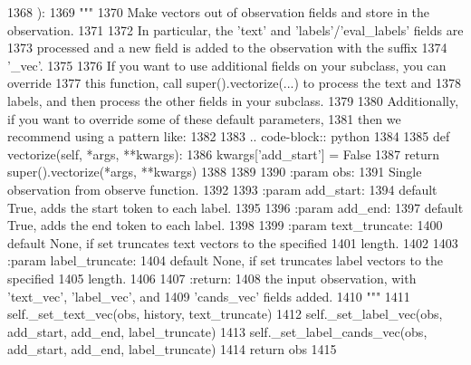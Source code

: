 \begin{DoxyCode}
1368     ):
1369         \textcolor{stringliteral}{"""}
1370 \textcolor{stringliteral}{        Make vectors out of observation fields and store in the observation.}
1371 \textcolor{stringliteral}{}
1372 \textcolor{stringliteral}{        In particular, the 'text' and 'labels'/'eval\_labels' fields are}
1373 \textcolor{stringliteral}{        processed and a new field is added to the observation with the suffix}
1374 \textcolor{stringliteral}{        '\_vec'.}
1375 \textcolor{stringliteral}{}
1376 \textcolor{stringliteral}{        If you want to use additional fields on your subclass, you can override}
1377 \textcolor{stringliteral}{        this function, call super().vectorize(...) to process the text and}
1378 \textcolor{stringliteral}{        labels, and then process the other fields in your subclass.}
1379 \textcolor{stringliteral}{}
1380 \textcolor{stringliteral}{        Additionally, if you want to override some of these default parameters,}
1381 \textcolor{stringliteral}{        then we recommend using a pattern like:}
1382 \textcolor{stringliteral}{}
1383 \textcolor{stringliteral}{        .. code-block:: python}
1384 \textcolor{stringliteral}{}
1385 \textcolor{stringliteral}{          def vectorize(self, *args, **kwargs):}
1386 \textcolor{stringliteral}{              kwargs['add\_start'] = False}
1387 \textcolor{stringliteral}{              return super().vectorize(*args, **kwargs)}
1388 \textcolor{stringliteral}{}
1389 \textcolor{stringliteral}{}
1390 \textcolor{stringliteral}{        :param obs:}
1391 \textcolor{stringliteral}{            Single observation from observe function.}
1392 \textcolor{stringliteral}{}
1393 \textcolor{stringliteral}{        :param add\_start:}
1394 \textcolor{stringliteral}{            default True, adds the start token to each label.}
1395 \textcolor{stringliteral}{}
1396 \textcolor{stringliteral}{        :param add\_end:}
1397 \textcolor{stringliteral}{            default True, adds the end token to each label.}
1398 \textcolor{stringliteral}{}
1399 \textcolor{stringliteral}{        :param text\_truncate:}
1400 \textcolor{stringliteral}{            default None, if set truncates text vectors to the specified}
1401 \textcolor{stringliteral}{            length.}
1402 \textcolor{stringliteral}{}
1403 \textcolor{stringliteral}{        :param label\_truncate:}
1404 \textcolor{stringliteral}{            default None, if set truncates label vectors to the specified}
1405 \textcolor{stringliteral}{            length.}
1406 \textcolor{stringliteral}{}
1407 \textcolor{stringliteral}{        :return:}
1408 \textcolor{stringliteral}{            the input observation, with 'text\_vec', 'label\_vec', and}
1409 \textcolor{stringliteral}{            'cands\_vec' fields added.}
1410 \textcolor{stringliteral}{        """}
1411         self.\_set\_text\_vec(obs, history, text\_truncate)
1412         self.\_set\_label\_vec(obs, add\_start, add\_end, label\_truncate)
1413         self.\_set\_label\_cands\_vec(obs, add\_start, add\_end, label\_truncate)
1414         \textcolor{keywordflow}{return} obs
1415 
\end{DoxyCode}
